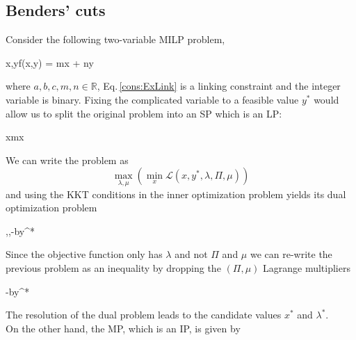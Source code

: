 \subsection{Benders' cuts}
Consider the following two-variable MILP problem,
\begin{mini!}[2]
	{x,y}{f(x,y) = mx + ny}{}{}{\quad {}}
\end{mini!}
where $a,b,c,m,n \in \mathbb{R}$, Eq.\,\eqref{cons:ExLink} is a linking constraint and the integer variable is binary. Fixing the complicated variable to a feasible value $y^{*}$ would allow us to split the original problem into an SP which is an LP:
\begin{tcolorbox}[colback=red!5!white,colframe=red!75!black,title=Slave problem]
\begin{mini!}[2]
	{x}{\alpha \equiv mx}{}{}{}
\end{mini!}
\end{tcolorbox}
We can write the problem as
\begin{equation}
    \max_{\lambda,\mu}\left(\min_{x}\mathcal{L}(x,y^{*},\lambda,\Pi,\mu)\right)
\end{equation}
and using the KKT conditions in the inner optimization problem yields its dual optimization problem
\begin{maxi!}[2]
	{\lambda,\Pi,\mu}{-by^{*}\lambda}{}{}{}
\end{maxi!}
Since the objective function only has $\lambda$ and not $\Pi$ and $\mu$ we can re-write the previous problem as an inequality by dropping the $(\Pi,\mu)$ Lagrange multipliers
\begin{tcolorbox}[colback=red!5!white,colframe=red!75!black,title=Dual formulation of slave problem]
\begin{maxi!}[2]
	{\lambda}{-by^{*}\lambda}{}{}{}
\end{maxi!}
\end{tcolorbox}
The resolution of the dual problem leads to the candidate values $x^{*}$ and $\lambda^{*}$.\\
On the other hand, the MP, which is an IP, is given by
